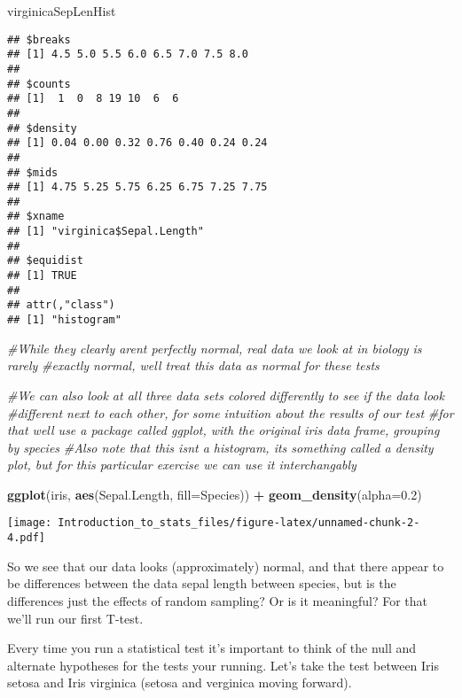 \documentclass[
]{article}
\newenvironment{Shaded}{\begin{snugshade}}{\end{snugshade}}
\newcommand{\CommentTok}[1]{\textcolor[rgb]{0.56,0.35,0.01}{\textit{#1}}}
\newcommand{\DataTypeTok}[1]{\textcolor[rgb]{0.13,0.29,0.53}{#1}}
\newcommand{\FloatTok}[1]{\textcolor[rgb]{0.00,0.00,0.81}{#1}}
\newcommand{\KeywordTok}[1]{\textcolor[rgb]{0.13,0.29,0.53}{\textbf{#1}}}
\newcommand{\NormalTok}[1]{#1}
\newcommand{\OperatorTok}[1]{\textcolor[rgb]{0.81,0.36,0.00}{\textbf{#1}}}
\newcommand{\StringTok}[1]{\textcolor[rgb]{0.31,0.60,0.02}{#1}}
\begin{document}
\begin{Shaded}
\begin{Highlighting}[]
\NormalTok{virginicaSepLenHist}
\end{Highlighting}
\end{Shaded}

\begin{verbatim}
## $breaks
## [1] 4.5 5.0 5.5 6.0 6.5 7.0 7.5 8.0
## 
## $counts
## [1]  1  0  8 19 10  6  6
## 
## $density
## [1] 0.04 0.00 0.32 0.76 0.40 0.24 0.24
## 
## $mids
## [1] 4.75 5.25 5.75 6.25 6.75 7.25 7.75
## 
## $xname
## [1] "virginica$Sepal.Length"
## 
## $equidist
## [1] TRUE
## 
## attr(,"class")
## [1] "histogram"
\end{verbatim}

\begin{Shaded}
\begin{Highlighting}[]
\CommentTok{\#While they clearly aren\textquotesingle{}t perfectly normal, real data we look at in biology is rarely}
\CommentTok{\#exactly normal, we\textquotesingle{}ll treat this data as normal for these tests}

\CommentTok{\#We can also look at all three data sets colored differently to see if the data look}
\CommentTok{\#different next to each other, for some intuition about the results of our test}
\CommentTok{\#for that we\textquotesingle{}ll use a package called ggplot, with the original iris data frame, grouping by species}
\CommentTok{\#Also note that this isn\textquotesingle{}t a histogram, it\textquotesingle{}s something called a density plot, but for this particular exercise we can use it interchangably}

\KeywordTok{ggplot}\NormalTok{(iris, }\KeywordTok{aes}\NormalTok{(Sepal.Length, }\DataTypeTok{fill=}\NormalTok{Species)) }\OperatorTok{+}\StringTok{ }\KeywordTok{geom\_density}\NormalTok{(}\DataTypeTok{alpha=}\FloatTok{0.2}\NormalTok{)}
\end{Highlighting}
\end{Shaded}

\texttt{[image: Introduction\_to\_stats\_files/figure-latex/unnamed-chunk-2-4.pdf]}

So we see that our data looks (approximately) normal, and that there
appear to be differences between the data sepal length between species,
but is the differences just the effects of random sampling? Or is it
meaningful? For that we'll run our first T-test.

Every time you run a statistical test it's important to think of the
null and alternate hypotheses for the tests your running. Let's take the
test between Iris setosa and Iris virginica (setosa and verginica moving
forward).
\end{document}
